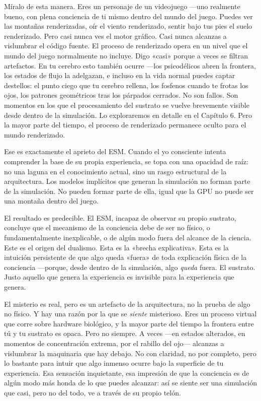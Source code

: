 \documentclass[11pt, twoside, openright]{book}
\begin{document}
Míralo de esta manera. Eres un personaje de un videojuego ---uno realmente bueno, con plena conciencia de ti mismo dentro del mundo del juego. Puedes ver las montañas renderizadas, oír el viento renderizado, sentir bajo tus pies el suelo renderizado. Pero casi nunca ves el motor gráfico. Casi nunca alcanzas a vislumbrar el código fuente. El proceso de renderizado opera en un nivel que el mundo del juego normalmente no incluye. Digo «casi» porque a veces se filtran artefactos. En tu cerebro esto también ocurre ---los psicodélicos abren la frontera, los estados de flujo la adelgazan, e incluso en la vida normal puedes captar destellos: el punto ciego que tu cerebro rellena, los fosfenos cuando te frotas los ojos, los patrones geométricos tras los párpados cerrados. No son fallos. Son momentos en los que el procesamiento del sustrato se vuelve brevemente visible desde dentro de la simulación. Lo exploraremos en detalle en el Capítulo 6. Pero la mayor parte del tiempo, el proceso de renderizado permanece oculto para el mundo renderizado.

Ese es exactamente el aprieto del ESM. Cuando el yo consciente intenta comprender la base de su propia experiencia, se topa con una opacidad de raíz: no una laguna en el conocimiento actual, sino un rasgo estructural de la arquitectura. Los modelos implícitos que generan la simulación no forman parte de la simulación. No pueden formar parte de ella, igual que la GPU no puede ser una montaña dentro del juego.

El resultado es predecible. El ESM, incapaz de observar su propio sustrato, concluye que el mecanismo de la conciencia debe de ser no físico, o fundamentalmente inexplicable, o de algún modo fuera del alcance de la ciencia. Este es el origen del dualismo. Esta es la «brecha explicativa». Esta es la intuición persistente de que algo queda «fuera» de toda explicación física de la conciencia ---porque, desde dentro de la simulación, algo \textit{queda} fuera. El sustrato. Justo aquello que genera la experiencia es invisible para la experiencia que genera.

El misterio es real, pero es un artefacto de la arquitectura, no la prueba de algo no físico. Y hay una razón por la que se \textit{siente} misterioso. Eres un proceso virtual que corre sobre hardware biológico, y la mayor parte del tiempo la frontera entre tú y tu sustrato es opaca. Pero no siempre. A veces ---en estados alterados, en momentos de concentración extrema, por el rabillo del ojo--- alcanzas a vislumbrar la maquinaria que hay debajo. No con claridad, no por completo, pero lo bastante para intuir que algo inmenso ocurre bajo la superficie de tu experiencia. Esa sensación inquietante, esa impresión de que la conciencia es de algún modo más honda de lo que puedes alcanzar: así se siente ser una simulación que casi, pero no del todo, ve a través de su propio telón.
\end{document}
